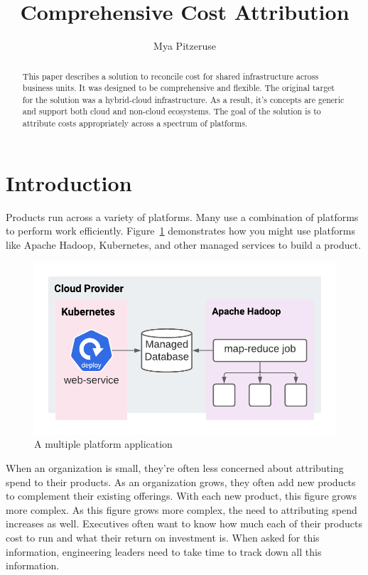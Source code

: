 \documentclass[10pt, a4paper, twocolumn]{article}
\title{Comprehensive Cost Attribution}
\author{Mya Pitzeruse}
\begin{document}
\maketitle

\begin{abstract}
  This paper describes a solution to reconcile cost for shared infrastructure across business units.
  It was designed to be comprehensive and flexible.
  The original target for the solution was a hybrid-cloud infrastructure.
  As a result, it's concepts are generic and support both cloud and non-cloud ecosystems.
  The goal of the solution is to attribute costs appropriately across a spectrum of platforms.
\end{abstract}


\section*{Introduction}
  Products run across a variety of platforms.
  Many use a combination of platforms to perform work efficiently.
  Figure~\ref{figure:1} demonstrates how you might use platforms like Apache Hadoop, Kubernetes, and other managed services to build a product.

  \begin{figure}[H]
    \centering
    \includegraphics[width=\linewidth]{./cost-attribution-application.png}
    \caption{A multiple platform application}
    \label{figure:1}
  \end{figure}

  When an organization is small, they're often less concerned about attributing spend to their products.
  As an organization grows, they often add new products to complement their existing offerings.
  With each new product, this figure grows more complex.
  As this figure grows more complex, the need to attributing spend increases as well.
  Executives often want to know how much each of their products cost to run and what their return on investment is.
  When asked for this information, engineering leaders need to take time to track down all this information.
\end{document}
